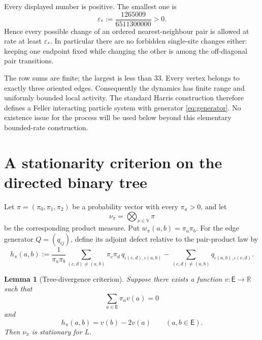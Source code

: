 \documentclass[11pt]{article}
\newtheorem{lemma}[theorem]{Lemma}
\newcommand{\EE}{\mathsf E}
\newcommand{\V}{\mathbb V}
\begin{document}
Every displayed number is positive.  The smallest one is
\begin{equation}
 \varepsilon_*:=\frac{1265009}{6511300000}>0.
 \label{eq:minrate}
\end{equation}
Hence every possible change of an ordered nearest-neighbour pair is allowed at
rate at least $\varepsilon_*$.  In particular there are no forbidden
single-site changes either: keeping one endpoint fixed while changing the other
is among the off-diagonal pair transitions.

The row sums are finite; the largest is less than $33$.  Every vertex belongs to
exactly three oriented edges.  Consequently the dynamics has finite range and
uniformly bounded local activity.  The standard Harris construction therefore
defines a Feller interacting particle system with generator
\eqref{eq:generator}.  No existence issue for the process will be used below
beyond this elementary bounded-rate construction.

\section{A stationarity criterion on the directed binary tree}

Let $\pi=(\pi_0,\pi_1,\pi_2)$ be a probability vector with every $\pi_a>0$,
and let
\[
  \nu_\pi=\bigotimes_{x\in\V}\pi
\]
be the corresponding product measure.  Put
$w_\pi(a,b)=\pi_a\pi_b$.  For the edge generator $Q=(q_{ij})$, define its
adjoint defect relative to the pair-product law by
\begin{equation}
 h_\pi(a,b)
 :=\frac{1}{\pi_a\pi_b}
   \sum_{(c,d)\ne(a,b)}\pi_c\pi_d\,
     q_{\iota(c,d),\iota(a,b)}
   -\sum_{(c,d)\ne(a,b)}q_{\iota(a,b),\iota(c,d)}.
 \label{eq:defh}
\end{equation}

\begin{lemma}[Tree-divergence criterion]\label{lem:divergence}
Suppose there exists a function $v:\EE\to\mathbb R$ such that
\begin{equation}
  \sum_{a\in\EE}\pi_a v(a)=0
  \label{eq:vmean0}
\end{equation}
and
\begin{equation}
  h_\pi(a,b)=v(b)-2v(a)
  \qquad(a,b\in\EE).
  \label{eq:divergence}
\end{equation}
Then $\nu_\pi$ is stationary for $L$.
\end{lemma}
\end{document}
